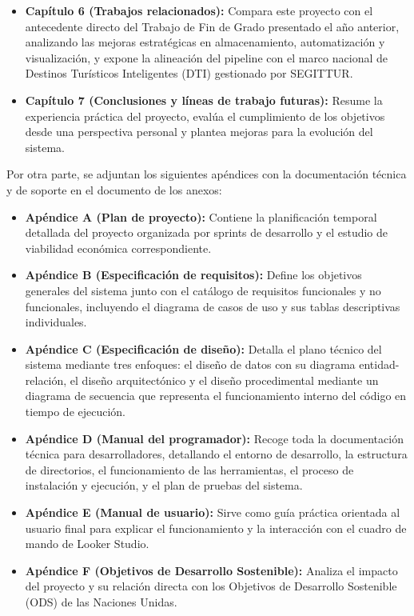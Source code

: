 \begin{itemize}
    \item \textbf{Capítulo 6 (Trabajos relacionados):} Compara este proyecto con el antecedente directo del Trabajo de Fin de Grado presentado el año anterior, analizando las mejoras estratégicas en almacenamiento, automatización y visualización, y expone la alineación del pipeline con el marco nacional de Destinos Turísticos Inteligentes (DTI) gestionado por SEGITTUR.
    \item \textbf{Capítulo 7 (Conclusiones y líneas de trabajo futuras):} Resume la experiencia práctica del proyecto, evalúa el cumplimiento de los objetivos desde una perspectiva personal y plantea mejoras para la evolución del sistema.
\end{itemize}

Por otra parte, se adjuntan los siguientes apéndices con la documentación técnica y de soporte en el documento de los anexos:
\begin{itemize}
    \item \textbf{Apéndice A (Plan de proyecto):} Contiene la planificación temporal detallada del proyecto organizada por sprints de desarrollo y el estudio de viabilidad económica correspondiente.
    \item \textbf{Apéndice B (Especificación de requisitos):} Define los objetivos generales del sistema junto con el catálogo de requisitos funcionales y no funcionales, incluyendo el diagrama de casos de uso y sus tablas descriptivas individuales.
    \item \textbf{Apéndice C (Especificación de diseño):} Detalla el plano técnico del sistema mediante tres enfoques: el diseño de datos con su diagrama entidad-relación, el diseño arquitectónico y el diseño procedimental mediante un diagrama de secuencia que representa el funcionamiento interno del código en tiempo de ejecución.
    \item \textbf{Apéndice D (Manual del programador):} Recoge toda la documentación técnica para desarrolladores, detallando el entorno de desarrollo, la estructura de directorios, el funcionamiento de las herramientas, el proceso de instalación y ejecución, y el plan de pruebas del sistema.
    \item \textbf{Apéndice E (Manual de usuario):} Sirve como guía práctica orientada al usuario final para explicar el funcionamiento y la interacción con el cuadro de mando de Looker Studio.
    \item \textbf{Apéndice F (Objetivos de Desarrollo Sostenible):} Analiza el impacto del proyecto y su relación directa con los Objetivos de Desarrollo Sostenible (ODS) de las Naciones Unidas.
\end{itemize}

